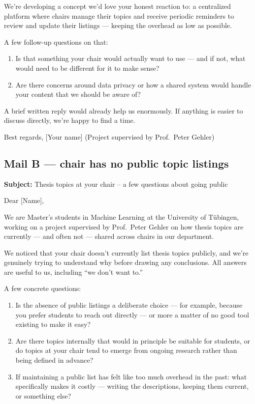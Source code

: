 \documentclass[11pt,a4paper]{article}
\begin{document}
\noindent We're developing a concept we'd love your honest reaction to: a
centralized platform where chairs manage their topics and receive periodic
reminders to review and update their listings --- keeping the overhead as low as
possible.

\medskip
\noindent A few follow-up questions on that:

\begin{enumerate}[leftmargin=1.4em,itemsep=0.35em,resume]
  \item Is that something your chair would actually want to use --- and if not,
 what would need to be different for it to make sense?
  \item Are there concerns around data privacy or how a shared system would
 handle your content that we should be aware of?
\end{enumerate}

\noindent A brief written reply would already help us enormously. If anything is
easier to discuss directly, we're happy to find a time.

\medskip
\noindent Best regards, [Your name] (Project supervised by Prof.\ Peter Gehler)

\subsection*{Mail B --- chair has no public topic listings}

\noindent\textbf{Subject:} Thesis topics at your chair -- a few questions about going public

\medskip
\noindent Dear [Name],

\medskip
\noindent We are Master's students in Machine Learning at the University of
T\"ubingen, working on a project supervised by Prof.\ Peter Gehler on how thesis
topics are currently --- and often not --- shared across chairs in our
department.

\medskip
\noindent We noticed that your chair doesn't currently list thesis topics
publicly, and we're genuinely trying to understand why before drawing any
conclusions. All answers are useful to us, including ``we don't want to.''

\medskip
\noindent A few concrete questions:

\begin{enumerate}[leftmargin=1.4em,itemsep=0.35em]
  \item Is the absence of public listings a deliberate choice --- for example,
 because you prefer students to reach out directly --- or more a matter of no
 good tool existing to make it easy?
  \item Are there topics internally that would in principle be suitable for
 students, or do topics at your chair tend to emerge from ongoing research
 rather than being defined in advance?
  \item If maintaining a public list has felt like too much overhead in the
 past: what specifically makes it costly --- writing the descriptions,
 keeping them current, or something else?
\end{enumerate}
\end{document}
